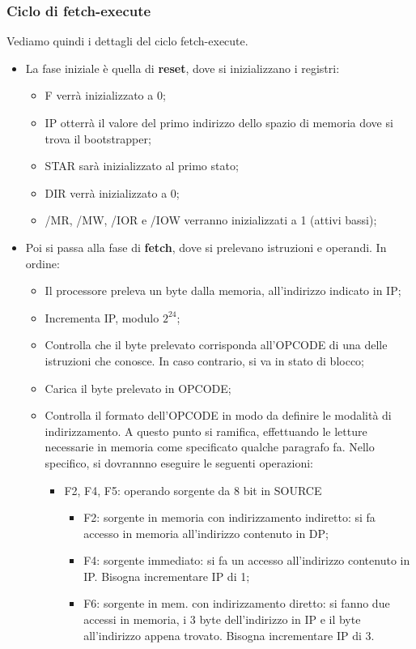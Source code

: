 \documentclass[a4paper,11pt]{article}
\begin{document}
\subsubsection{Ciclo di fetch-execute}
Vediamo quindi i dettagli del ciclo fetch-execute.
\begin{itemize}
	\item La fase iniziale è quella di \textbf{reset}, dove si inizializzano i registri:
		\begin{itemize}
			\item F verrà inizializzato a 0;
			\item IP otterrà il valore del primo indirizzo dello spazio di memoria dove si trova il bootstrapper;
			\item STAR sarà inizializzato al primo stato;
			\item DIR verrà inizializzato a 0;
			\item /MR, /MW, /IOR e /IOW verranno inizializzati a 1 (attivi bassi);
		\end{itemize}
	\item Poi si passa alla fase di \textbf{fetch}, dove si prelevano istruzioni e operandi. In ordine:
		\begin{itemize}
			\item Il processore preleva un byte dalla memoria, all'indirizzo indicato in IP;
			\item Incrementa IP, modulo $2^{24}$;
			\item Controlla che il byte prelevato corrisponda all'OPCODE di una delle istruzioni che conosce.
				In caso contrario, si va in stato di blocco;
			\item Carica il byte prelevato in OPCODE;
			\item Controlla il formato dell'OPCODE in modo da definire le modalità di indirizzamento.
				A questo punto si ramifica, effettuando le letture necessarie in memoria come specificato qualche paragrafo fa. Nello specifico, si dovrannno eseguire le seguenti operazioni:
				\begin{itemize}
					\item F2, F4, F5: operando sorgente da 8 bit in SOURCE
						\begin{itemize}
							\item F2: sorgente in memoria con indirizzamento indiretto: si fa accesso in memoria all'indirizzo contenuto in DP;
							\item F4: sorgente immediato: si fa un accesso all'indirizzo contenuto in IP. Bisogna incrementare IP di 1;
							\item F6: sorgente in mem. con indirizzamento diretto: si fanno due accessi in memoria, i 3 byte dell'indirizzo in IP e il byte all'indirizzo appena trovato. Bisogna incrementare IP di 3.

\end{itemize}
\end{itemize}
\end{itemize}
\end{itemize}
\end{document}
